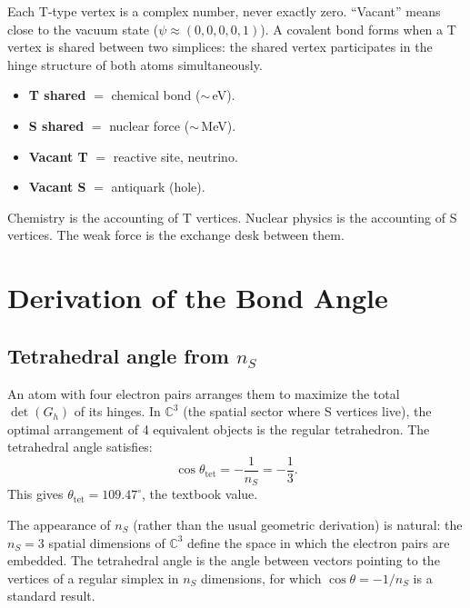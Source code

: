 \documentclass[12pt]{article}
\theoremstyle{remark}
\begin{document}
Each T-type vertex is a complex number, never exactly zero. ``Vacant'' means close to the vacuum state ($\psi \approx (0,0,0,0,1)$). A covalent bond forms when a T vertex is shared between two simplices: the shared vertex participates in the hinge structure of both atoms simultaneously.

\begin{itemize}
\item \textbf{T shared} $=$ chemical bond ($\sim$\,eV).
\item \textbf{S shared} $=$ nuclear force ($\sim$\,MeV).
\item \textbf{Vacant T} $=$ reactive site, neutrino.
\item \textbf{Vacant S} $=$ antiquark (hole).
\end{itemize}

Chemistry is the accounting of T vertices. Nuclear physics is the accounting of S vertices. The weak force is the exchange desk between them.

\section{Derivation of the Bond Angle}

\subsection{Tetrahedral angle from $n_S$}

An atom with four electron pairs arranges them to maximize the total $\det(G_h)$ of its hinges. In $\mathbb{C}^3$ (the spatial sector where S vertices live), the optimal arrangement of 4 equivalent objects is the regular tetrahedron. The tetrahedral angle satisfies:
\begin{equation}
\cos\theta_\text{tet} = -\frac{1}{n_S} = -\frac{1}{3}.
\end{equation}
This gives $\theta_\text{tet} = 109.47^\circ$, the textbook value.

The appearance of $n_S$ (rather than the usual geometric derivation) is natural: the $n_S = 3$ spatial dimensions of $\mathbb{C}^3$ define the space in which the electron pairs are embedded. The tetrahedral angle is the angle between vectors pointing to the vertices of a regular simplex in $n_S$ dimensions, for which $\cos\theta = -1/n_S$ is a standard result.
\end{document}
